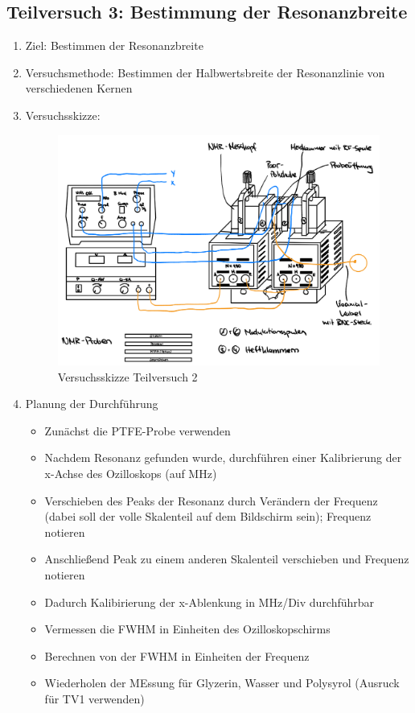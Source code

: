 \documentclass{article}
\begin{document}
\newpage

\subsection{Teilversuch 3: Bestimmung der Resonanzbreite}
\begin{enumerate}[label = (\Roman*)]
    \item Ziel: Bestimmen der Resonanzbreite
    
    \item Versuchsmethode: Bestimmen der Halbwertsbreite der Resonanzlinie von verschiedenen Kernen
    
    \item Versuchsskizze:
    
        \begin{figure}[H]
        \centering
        \includegraphics[width=0.7\linewidth]{Abbildungen/TV1-5.jpeg}
        \caption{Versuchsskizze Teilversuch 2}
        \end{figure}

    \item Planung der Durchführung
        \begin{itemize}
           \item Zunächst die PTFE-Probe verwenden
           \item Nachdem Resonanz gefunden wurde, durchführen einer Kalibrierung der x-Achse des Ozilloskops (auf MHz)
           \item Verschieben des Peaks der Resonanz durch Verändern der Frequenz (dabei soll der volle Skalenteil auf dem Bildschirm sein); Frequenz notieren
           \item Anschließend Peak zu einem anderen Skalenteil verschieben und Frequenz notieren
           \item Dadurch Kalibirierung der x-Ablenkung in MHz/Div durchführbar
           \item Vermessen die FWHM in Einheiten des Ozilloskopschirms
           \item Berechnen von der FWHM in Einheiten der Frequenz
           \item Wiederholen der MEssung für Glyzerin, Wasser und Polysyrol (Ausruck für TV1 verwenden)
        \end{itemize}


\end{enumerate}
\end{document}
